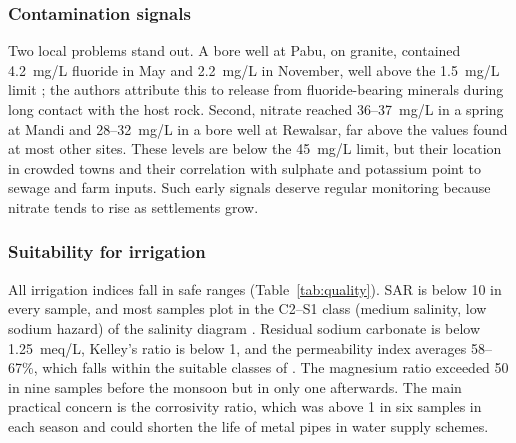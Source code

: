 \documentclass[10pt,a4paper,twocolumn]{article}
\newcommand{\mgl}{mg/L}
\begin{document}
\subsubsection{Contamination signals}
Two local problems stand out. A bore well at Pabu, on granite, contained 4.2~\mgl{} fluoride in
May and 2.2~\mgl{} in November, well above the 1.5~\mgl{} limit \citep{bis2012,who2017}; the
authors attribute this to release from fluoride-bearing minerals during long contact with the
host rock. Second, nitrate reached 36--37~\mgl{} in a spring at Mandi and 28--32~\mgl{} in a bore
well at Rewalsar, far above the values found at most other sites. These levels are
below the 45~\mgl{} limit, but their location in crowded towns and their correlation with
sulphate and potassium point to sewage and farm inputs. Such early signals deserve
regular monitoring because nitrate tends to rise as settlements grow.

\subsubsection{Suitability for irrigation}
All irrigation indices fall in safe ranges (Table~\ref{tab:quality}). SAR is below 10 in every
sample, and most samples plot in the C2--S1 class (medium salinity, low sodium hazard) of the
salinity diagram \citep{richards1954}. Residual sodium carbonate is below 1.25~meq/L, Kelley's
ratio is below 1, and the permeability index averages 58--67\%, which falls within the suitable
classes of \citet{doneen1964}. The magnesium ratio exceeded 50 in nine samples before the
monsoon but in only one afterwards. The main practical concern is the corrosivity ratio, which
was above 1 in six samples in each season and could shorten the life of metal pipes in water
supply schemes.
\end{document}
